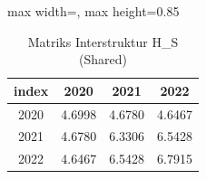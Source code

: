 \begin{table}[H]
\centering
\caption{Matriks Interstruktur H\_S (Shared)} \makeatletter{}\makeatother
\begin{adjustbox}{max width=\textwidth, max height=0.85\textheight}
\begin{tabular}{|c|c|c|c|}
\hline
\textbf{index} & \textbf{2020} & \textbf{2021} & \textbf{2022} \\
\hline
2020 & 4.6998 & 4.6780 & 4.6467 \\
2021 & 4.6780 & 6.3306 & 6.5428 \\
2022 & 4.6467 & 6.5428 & 6.7915 \\
\hline
\end{tabular}
\end{adjustbox}
\end{table}